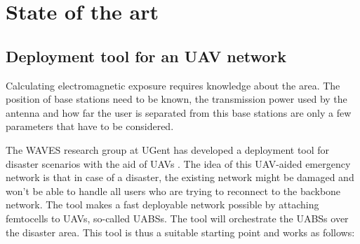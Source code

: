 \chapter{State of the art}
\label{chap:stateoftheart}

\section{Deployment tool for an UAV network}
\label{sec:stateoftheart:deploymenttool}

Calculating electromagnetic exposure requires knowledge about the area. The position of base stations need to be known,
 the transmission power used by the antenna and how far the user is separated from this base stations are only a few parameters
 that have to be considered.

The WAVES research group at UGent has developed a deployment tool for disaster scenarios with the aid of UAVs \cite{J2}.
The idea of this UAV-aided emergency network is that in case of a disaster, the existing network might be damaged and won't be able 
to handle all users who are trying to reconnect to the backbone network. 
The tool makes a fast deployable network possible by attaching femtocells to UAVs, so-called \gls{UABS}s.
The tool will orchestrate the \gls{UABS}s over the disaster area. This tool is thus a suitable starting point and works as follows:


